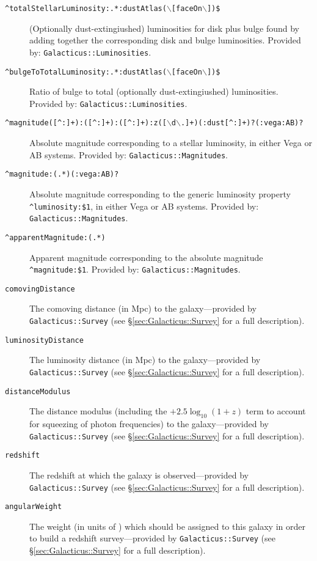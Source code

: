 \begin{description}
 \item[{\tt \textasciicircum totalStellarLuminosity:.*:dustAtlas($\backslash$[faceOn$\backslash$])\$}] (Optionally dust-extingiushed) luminosities for disk plus bulge found by adding together the corresponding disk and bulge luminosities. Provided by: {\tt Galacticus::Luminosities}.
 \item[{\tt \textasciicircum bulgeToTotalLuminosity:.*:dustAtlas($\backslash$[faceOn$\backslash$])\$}] Ratio of bulge to total (optionally dust-extingiushed) luminosities. Provided by: {\tt Galacticus::Luminosities}.
 \item[{\tt \textasciicircum magnitude([\textasciicircum :]+):([\textasciicircum :]+):([\textasciicircum :]+):z([$\backslash$d$\backslash$.]+)(:dust[\textasciicircum :]+)?(:vega\textbar :AB)?}] Absolute magnitude corresponding to a stellar luminosity, in either Vega or AB systems. Provided by: {\tt Galacticus::Magnitudes}.
 \item[{\tt \textasciicircum magnitude:(.*)(:vega\textbar :AB)?}] Absolute magnitude corresponding to the generic luminosity property {\tt \textasciicircum luminosity:\$1}, in either Vega or AB systems. Provided by: {\tt Galacticus::Magnitudes}.
 \item[{\tt \textasciicircum apparentMagnitude:(.*)}] Apparent magnitude corresponding to the absolute magnitude {\tt \textasciicircum magnitude:\$1}. Provided by: {\tt Galacticus::Magnitudes}.
 \item[{\tt comovingDistance}] The comoving distance (in Mpc) to the galaxy---provided by {\tt Galacticus::Survey} (see \S\ref{sec:Galacticus::Survey} for a full description).
 \item[{\tt luminosityDistance}] The luminosity distance (in Mpc) to the galaxy---provided by {\tt Galacticus::Survey} (see \S\ref{sec:Galacticus::Survey} for a full description).
 \item[{\tt distanceModulus}] The distance modulus (including the $+2.5\log_{10}(1+z)$ term to account for squeezing of photon frequencies) to the galaxy---provided by {\tt Galacticus::Survey} (see \S\ref{sec:Galacticus::Survey} for a full description).
 \item[{\tt redshift}] The redshift at which the galaxy is observed---provided by {\tt Galacticus::Survey} (see \S\ref{sec:Galacticus::Survey} for a full description).
 \item[{\tt angularWeight}] The weight (in units of ) which should be assigned to this galaxy in order to build a redshift survey---provided by {\tt Galacticus::Survey} (see \S\ref{sec:Galacticus::Survey} for a full description).

\end{description}
